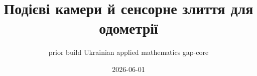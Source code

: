 \documentclass[11pt,a4paper,oneside]{book}
\begin{document}
\pagestyle{plain}
\title{Подієві камери й сенсорне злиття для одометрії}
\author{prior build Ukrainian applied mathematics gap-core}
\date{2026-06-01}
\maketitle
\tableofcontents

\end{document}
